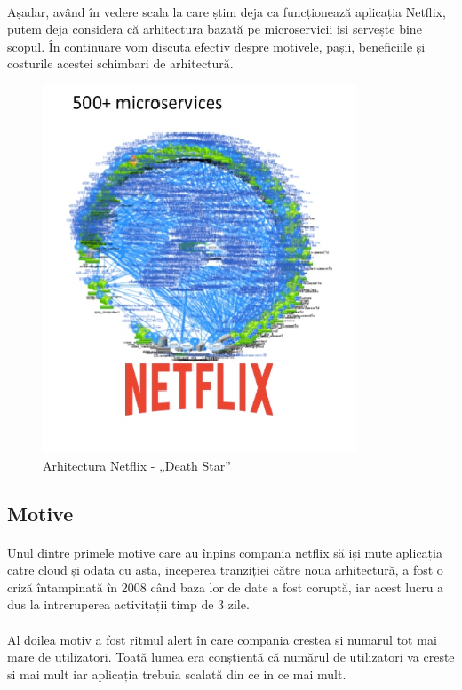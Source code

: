 \documentclass[12pt]{report}
\begin{document}
  	\paragraph{}Așadar, având în vedere scala la care știm deja ca funcționează aplicația Netflix, putem deja considera că arhitectura bazată pe microservicii isi servește bine scopul. În continuare vom discuta efectiv despre motivele, pașii, beneficiile și costurile acestei schimbari de arhitectură. \cite{migratingToMicroservices}
  	\begin{figure}[h]
  	\centering
  	\includegraphics[scale=.8]{deathstararhitecture}
	\caption{Arhitectura Netflix - „Death Star”  \cite{harris1}}  
	\label{deathStarArhitecture}
  	\end{figure}
	\subsection{Motive}
	\paragraph{}Unul dintre primele motive care au înpins compania netflix să iși mute aplicația catre cloud și odata cu asta, inceperea tranziției către noua arhitectură, a fost o criză întampinată în 2008 când baza lor de date a fost coruptă, iar acest lucru a dus la intreruperea activitații timp de 3 zile. 
	\paragraph{}Al doilea motiv a fost ritmul alert în care compania crestea si numarul tot mai mare de utilizatori. Toată lumea era conștientă că numărul de utilizatori va creste si mai mult iar aplicația trebuia scalată din ce in ce mai mult.
\end{document}
